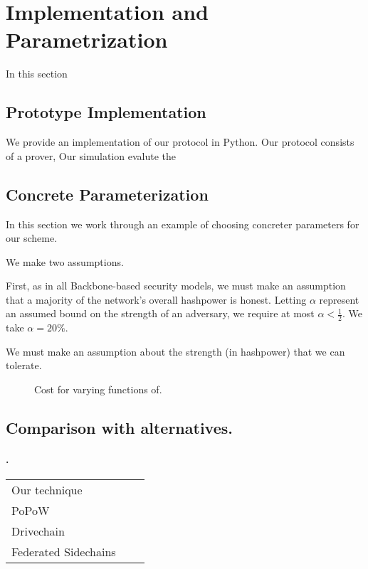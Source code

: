 \section{Implementation and Parametrization}
In this section

\subsection{Prototype Implementation}
We provide an implementation of our protocol in Python. Our protocol consists of a prover, 
Our simulation evalute the

\subsection{Concrete Parameterization}
In this section we work through an example of choosing concreter parameters for our scheme.

We make two assumptions.

First, as in all Backbone-based security models, we must make an assumption that a majority of the network's overall hashpower is honest. Letting $\alpha$ represent an assumed bound on the strength of an adversary,
we require at most $\alpha < \frac{1}{2}$.
We take $\alpha = 20\%$.

We must make an assumption about the strength (in hashpower) that we can tolerate.

\begin{figure}
  \caption{Cost for varying functions of.}
\end{figure}


\subsection{Comparison with alternatives.}

\paragraph{.}

\begin{table}
  \begin{tabular}{lll}
    Our technique    & & \\
    PoPoW~\cite{kls} & & \\
    Drivechain    & & \\
    Federated Sidechains & & \\
  \end{tabular}
\end{table}


